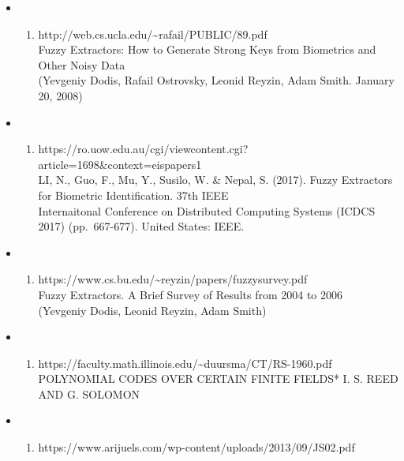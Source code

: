\documentclass[11pt]{article}
\providecommand{\tightlist}{%
      \setlength{\itemsep}{0pt}\setlength{\parskip}{0pt}}
\begin{document}
\begin{itemize}
\item
  \begin{enumerate}
  \def\labelenumi{(\arabic{enumi})}
  \tightlist
  \item
    http://web.cs.ucla.edu/\textasciitilde rafail/PUBLIC/89.pdf\\
    Fuzzy Extractors: How to Generate Strong Keys from Biometrics and
    Other Noisy Data\\
    (Yevgeniy Dodis, Rafail Ostrovsky, Leonid Reyzin, Adam Smith.
    January 20, 2008)
  \end{enumerate}
\item
  \begin{enumerate}
  \def\labelenumi{(\arabic{enumi})}
  \setcounter{enumi}{1}
  \tightlist
  \item
    https://ro.uow.edu.au/cgi/viewcontent.cgi?article=1698\&context=eispapers1\\
    LI, N., Guo, F., Mu, Y., Susilo, W. \& Nepal, S. (2017). Fuzzy
    Extractors for Biometric Identification. 37th IEEE\\
    Internaitonal Conference on Distributed Computing Systems (ICDCS
    2017) (pp.~667-677). United States: IEEE.
  \end{enumerate}
\item
  \begin{enumerate}
  \def\labelenumi{(\arabic{enumi})}
  \setcounter{enumi}{2}
  \tightlist
  \item
    https://www.cs.bu.edu/\textasciitilde reyzin/papers/fuzzysurvey.pdf\\
    Fuzzy Extractors. A Brief Survey of Results from 2004 to 2006\\
    (Yevgeniy Dodis, Leonid Reyzin, Adam Smith)
  \end{enumerate}
\item
  \begin{enumerate}
  \def\labelenumi{(\arabic{enumi})}
  \setcounter{enumi}{3}
  \tightlist
  \item
    https://faculty.math.illinois.edu/\textasciitilde duursma/CT/RS-1960.pdf\\
    POLYNOMIAL CODES OVER CERTAIN FINITE FIELDS* I. S. REED AND G.
    SOLOMON
  \end{enumerate}
\item
  \begin{enumerate}
  \def\labelenumi{(\arabic{enumi})}
  \setcounter{enumi}{4}
  \tightlist
  \item
    https://www.arijuels.com/wp-content/uploads/2013/09/JS02.pdf\\

\end{enumerate}
\end{itemize}
\end{document}
